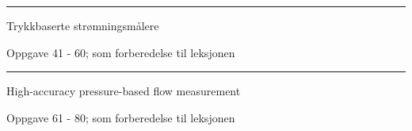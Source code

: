 \vskip 10pt



\filbreak
\hrule \vskip 5pt
\noindent {}

\vskip 5pt


\vskip 2pt  Trykkbaserte strømningsmålere

\vskip 2pt \noindent Oppgave 41 - 60;  som forberedelse til leksjonen%

\vskip 10pt




\filbreak
\hrule \vskip 5pt

\noindent {}

\vskip 5pt



\vskip 2pt  High-accuracy pressure-based flow measurement

\vskip 2pt \noindent Oppgave 61 - 80;  som forberedelse til leksjonen%


%

\noindent {} 

\vskip 5pt


